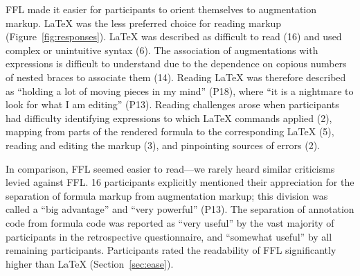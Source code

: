FFL made it easier for participants to orient themselves to augmentation markup. LaTeX was the less preferred choice for reading markup (Figure~\ref{fig:responses}). LaTeX was described as difficult to read (16) and used complex or unintuitive syntax (6). The association of augmentations with expressions is difficult to understand due to the dependence on copious numbers of nested braces to associate them (14). Reading LaTeX was therefore described as ``holding a lot of moving pieces in my mind'' (P18), where ``it is a nightmare to look for what I am editing'' (P13). Reading challenges arose when participants had difficulty identifying expressions to which LaTeX commands applied (2), mapping from parts of the rendered formula to the corresponding LaTeX (5), reading and editing the markup (3), and pinpointing sources of errors (2).



In comparison, FFL seemed easier to read---we rarely heard similar criticisms levied against FFL. 16 participants explicitly mentioned their appreciation for the separation of formula markup from augmentation markup; this division was called a ``big advantage'' and ``very powerful'' (P13). The separation of annotation code from formula code was reported as ``very useful'' by the vast majority of participants in the retrospective questionnaire, and ``somewhat useful'' by all remaining participants. Participants rated the readability of FFL significantly higher than LaTeX (Section~\ref{sec:ease}).


